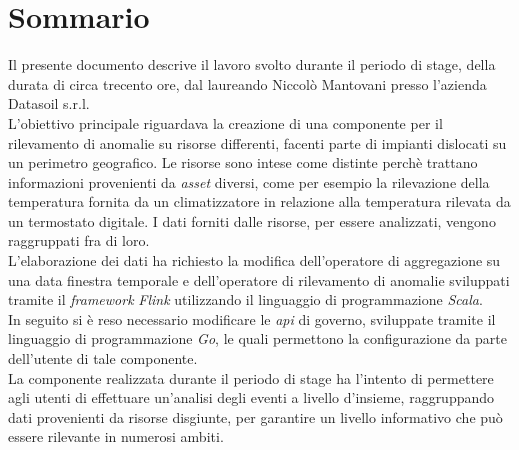 
\cleardoublepage
{}
{}
\begingroup
\let\clearpage\relax
\let\cleardoublepage\relax
\let\cleardoublepage\relax

\chapter*{Sommario}

Il presente documento descrive il lavoro svolto durante il periodo di stage, della durata di circa trecento ore, dal laureando Niccolò Mantovani presso l'azienda Datasoil s.r.l.\\
L'obiettivo principale riguardava la creazione di una componente per il rilevamento di anomalie su risorse differenti, facenti parte di impianti dislocati su un perimetro geografico. Le risorse sono intese come distinte perchè trattano informazioni provenienti da \textit{asset} diversi, come per esempio la rilevazione della temperatura fornita da un climatizzatore in relazione alla temperatura rilevata da un termostato digitale. I dati forniti dalle risorse, per essere analizzati, vengono raggruppati fra di loro.\\
L'elaborazione dei dati ha richiesto la modifica dell'operatore di aggregazione su una data finestra temporale e dell'operatore di rilevamento di anomalie sviluppati tramite il \textit{\textit{\gls{framework}}} \textit{Flink} utilizzando il linguaggio di programmazione \textit{Scala}.\\
In seguito si è reso necessario modificare le \textit{\gls{api}} di governo, sviluppate tramite il linguaggio di programmazione \textit{Go}, le quali permettono la configurazione da parte dell'utente di tale componente.\\
La componente realizzata durante il periodo di stage ha l'intento di permettere agli utenti di effettuare un'analisi degli eventi a livello d'insieme, raggruppando dati provenienti da risorse disgiunte, per garantire un livello informativo che può essere rilevante in numerosi ambiti.

%
%

\endgroup			

\vfill


